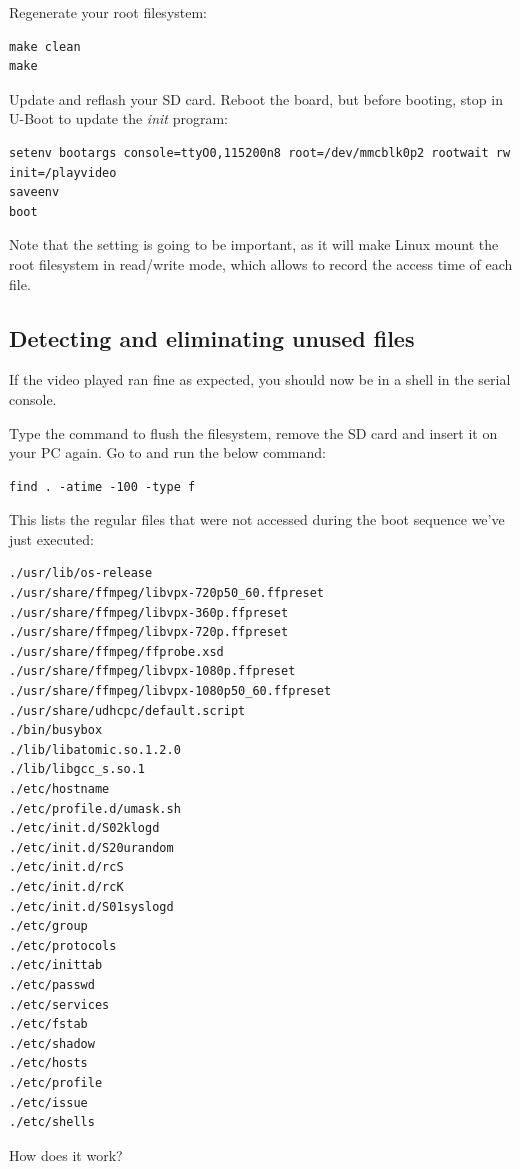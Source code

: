 Regenerate your root filesystem:
\begin{verbatim}
make clean
make
\end{verbatim}

Update and reflash your SD card. Reboot the board, but before booting,
stop in U-Boot to update the {\em init} program:

\begin{verbatim}
setenv bootargs console=ttyO0,115200n8 root=/dev/mmcblk0p2 rootwait rw init=/playvideo
saveenv
boot
\end{verbatim}

Note that the  setting is going to be important, as it will
make Linux mount the root filesystem in read/write mode, which allows to
record the access time of each file.

\subsection{Detecting and eliminating unused files}

If the video played ran fine as expected, you should now be in a shell
in the serial console.

Type the  command to flush the filesystem, remove the SD card
and insert it on your PC again. Go to  and run
the below command:

\begin{verbatim}
find . -atime -100 -type f
\end{verbatim}

This lists the regular files that were not accessed during the boot
sequence we've just executed:

\begin{verbatim}
./usr/lib/os-release
./usr/share/ffmpeg/libvpx-720p50_60.ffpreset
./usr/share/ffmpeg/libvpx-360p.ffpreset
./usr/share/ffmpeg/libvpx-720p.ffpreset
./usr/share/ffmpeg/ffprobe.xsd
./usr/share/ffmpeg/libvpx-1080p.ffpreset
./usr/share/ffmpeg/libvpx-1080p50_60.ffpreset
./usr/share/udhcpc/default.script
./bin/busybox
./lib/libatomic.so.1.2.0
./lib/libgcc_s.so.1
./etc/hostname
./etc/profile.d/umask.sh
./etc/init.d/S02klogd
./etc/init.d/S20urandom
./etc/init.d/rcS
./etc/init.d/rcK
./etc/init.d/S01syslogd
./etc/group
./etc/protocols
./etc/inittab
./etc/passwd
./etc/services
./etc/fstab
./etc/shadow
./etc/hosts
./etc/profile
./etc/issue
./etc/shells
\end{verbatim}

How does it work?

